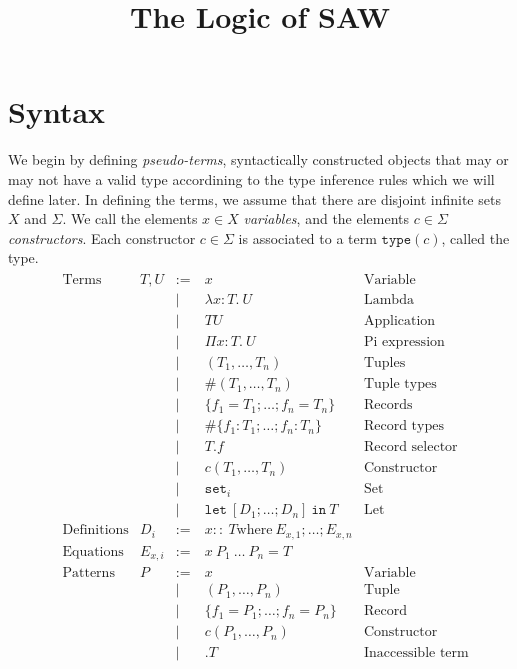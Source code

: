 \documentclass{article}
\title{The Logic of SAW}
\newcommand{\fn}[1]{\mathtt{#1}}
\newcommand{\set}[1]{\fn{set}_{#1}}
\newcommand{\lamexpr}[3]{\lambda {#1}{:}{#2}.\ {#3}}
\newcommand{\Piexpr}[3]{\Pi {#1}{:}{#2}.\ {#3}}
\newcommand{\letexpr}[2]{\fn{let}\ {#1}\ \fn{in}\ {#2}}
\begin{document}


\section{Syntax}

We begin by defining \emph{pseudo-terms}, syntactically constructed objects that
may or may not have a valid type accordining to the type inference rules which we
will define later.  In defining the terms, we assume that there are disjoint infinite
sets $X$ and $\Sigma$.  We call the elements $x \in X$ \emph{variables}, and the elements
$c \in \Sigma$ \emph{constructors}.  Each constructor $c \in \Sigma$ is associated to a
term $\fn{type}(c)$, called the type.
\begin{align*}
&\begin{array}{llrll}
\text{Terms}
& T,U    &:=\:& x & \text{Variable}\\
&        & |\:& \lamexpr{x}{T}{U} &\text{Lambda}\\
&        & |\:& T U &\text{Application}\\
&        & |\:& \Piexpr{x}{T}{U} &\text{Pi expression}\\
&        & |\:& (T_1, \dots, T_n)   & \text{Tuples}\\
&        & |\:& \#(T_1, \dots, T_n)                 & \text{Tuple types}\\
&        & |\:& \{ f_1 = T_1; \dots; f_n = T_n \}   & \text{Records}\\
&        & |\:& \#\{ f_1 : T_1; \dots; f_n : T_n \} & \text{Record types}\\
&        & |\:& T.f                                & \text{Record selector}\\ 
&        & |\:& c(T_1,\dots,T_n)                    & \text{Constructor}\\
&        & |\:& \set{i} & \text{Set}\\
&        & |\:& \letexpr{[ D_1; \dots; D_n ]}{T}    & \text{Let}\\
\text{Definitions}
&D_i     &:=\:&x ::\ T \text{where}\ E_{x,1}; \dots; E_{x,n}\\
\text{Equations}
&E_{x,i} &:=\:&x\ P_1\ \dots\ P_n = T\\
\text{Patterns}
&P       &:=\:&x & \text{Variable}\\
&        & |\:&(P_1, \dots, P_n) &\text{Tuple}\\ %
&        & |\:&\{ f_1 = P_1; \dots; f_n = P_n \} & \text{Record}\\ %
&        & |\:&c(P_1, \dots, P_n) & \text{Constructor}\\ %
&        & |\:&.T & \text{Inaccessible term}\\
\end{array}\\
\end{align*}
\end{document}
